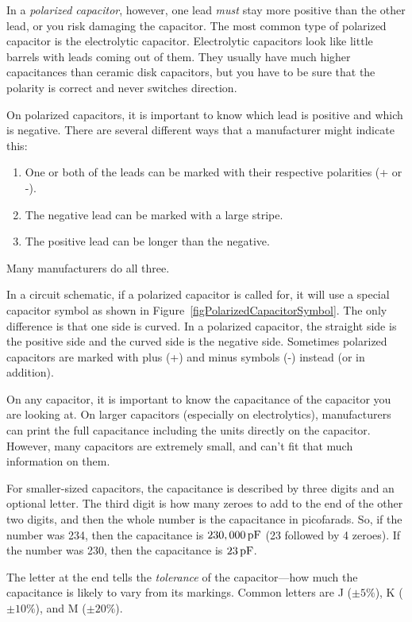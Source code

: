 In a \emph{polarized capacitor}, however, one lead \emph{must} stay more positive than the other lead, or you risk damaging the capacitor.
The most common type of polarized capacitor is the electrolytic capacitor.
Electrolytic capacitors look like little barrels with leads coming out of them.
They usually have much higher capacitances than ceramic disk capacitors, but you have to be sure that the polarity is correct and never switches direction.

On polarized capacitors, it is important to know which lead is positive and which is negative.  
There are several different ways that a manufacturer might indicate this:
\begin{enumerate}
\item One or both of the leads can be marked with their respective polarities (+ or -).
\item The negative lead can be marked with a large stripe.  
\item The positive lead can be longer than the negative.
\end{enumerate}
Many manufacturers do all three.

In a circuit schematic, if a polarized capacitor is called for, it will use a special capacitor symbol as shown in Figure~\ref{figPolarizedCapacitorSymbol}. 
The only difference is that one side is curved.
In a polarized capacitor, the straight side is the positive side and the curved side is the negative side.
Sometimes polarized capacitors are marked with plus (+) and minus symbols (-) instead (or in addition).


On any capacitor, it is important to know the capacitance of the capacitor you are looking at.
On larger capacitors (especially on electrolytics), manufacturers can print the full capacitance including the units directly on the capacitor.
However, many capacitors are extremely small, and can't fit that much information on them.

For smaller-sized capacitors, the capacitance is described by three digits and an optional letter.
The third digit is how many zeroes to add to the end of the other two digits, and then the whole number is the capacitance in picofarads.
So, if the number was 234, then the capacitance is $230,000\mypf$ (23 followed by 4 zeroes).  
If the number was 230, then the capacitance is $23\mypf$.

The letter at the end tells the \emph{tolerance} of the capacitor---how much the capacitance is likely to vary from its markings.
Common letters are J ($\pm5\%$), K ($\pm10\%$), and M ($\pm20\%$).

